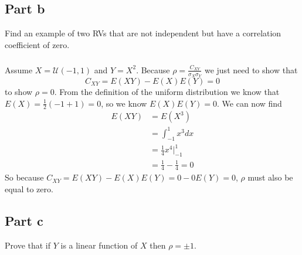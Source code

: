 \documentclass[11pt]{article}
\begin{document}
\subsection*{Part b}
Find an example of two RVs that are not independent but have a correlation coefficient of zero.

\subparagraph*{}
Assume $X=\mathcal{U}(-1,1)$ and $Y=X^2$. Because $\rho=\frac{C_{XY}}{\sigma_X \sigma_Y}$ we just need to show that 
\begin{equation*}
	C_{XY}=E(XY)-E(X)E(Y)=0
\end{equation*} to show $\rho=0$. From the definition of the uniform distribution we know that $E(X)=\frac{1}{2}(-1+1)=0$, so we know $E(X)E(Y)=0$. We can now find 
\begin{align*}
	E(XY) &= E(X^3) \\
	&= \int_{-1}^1 x^3dx \\
	&= \frac{1}{4} x^4 \Big|_{-1}^1 \\
	&= \frac{1}{4}-\frac{1}{4} = 0
\end{align*}
So because $C_{XY}=E(XY)-E(X)E(Y) = 0 - 0E(Y) = 0$, $\rho$ must also be equal to zero.

\subsection*{Part c}
Prove that if $Y$ is a linear function of $X$ then $\rho=\pm1$.
\end{document}
